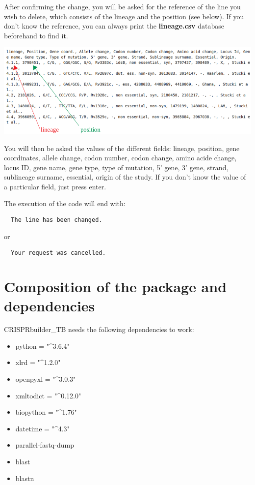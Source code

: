\documentclass[twoside,a4paper,11pt,frenchb,openany]{report}
\begin{document}
After confirming the change, you will be asked for the reference of
the line you wish to delete, which consists of the lineage and the
position (see below). If you don't know the reference, you can always
print the \textbf{lineage.csv} database beforehand to find it.

\includegraphics[width=16cm]{selection.png}

    You will then be asked the values of the different fields: lineage,
position, gene coordinates, allele change, codon number, codon change,
amino acide change, locus ID, gene name, gene type, type of mutation, 5'
gene, 3' gene, strand, sublineage surname, essential, origin of the
study. If you don't know the value of a particular field, just
press enter.

    The execution of the code will end with:

    \begin{verbatim}
  The line has been changed.
\end{verbatim}

    or

    \begin{verbatim}
  Your request was cancelled.
\end{verbatim}


    \section{Composition of the package and
dependencies}\label{composition-of-the-package-and-dependencies}

    CRISPRbuilder\_TB needs the following dependencies to work:

\begin{itemize}
\item
  python = "\^{}3.6.4"
\item
  xlrd = "\^{}1.2.0"
\item
  openpyxl = "\^{}3.0.3"
\item
  xmltodict = "\^{}0.12.0"
\item
  biopython = "\^{}1.76"
\item
  datetime = "\^{}4.3"
\item
  parallel-fastq-dump
\item
  blast
\item
  blastn
\end{itemize}
\end{document}
